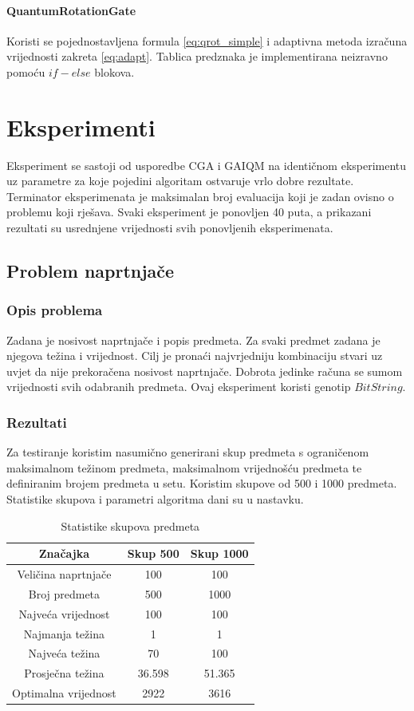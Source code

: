 \documentclass[times, utf8, zavrsni, numeric]{fer}
\begin{document}
\subsubsection{QuantumRotationGate}
Koristi se pojednostavljena formula \ref{eq:qrot_simple} i adaptivna metoda izračuna vrijednosti zakreta \ref{eq:adapt}. Tablica predznaka je implementirana neizravno pomoću $if-else$ blokova.

\chapter{Eksperimenti} 
\label{ch:primjena}
Eksperiment se sastoji od usporedbe CGA i GAIQM na identičnom eksperimentu uz parametre za koje pojedini algoritam ostvaruje vrlo dobre rezultate.
Terminator eksperimenata je maksimalan broj evaluacija koji je zadan ovisno o problemu koji rješava.
Svaki eksperiment je ponovljen 40 puta, a prikazani rezultati su usrednjene vrijednosti svih ponovljenih eksperimenata.

\section{Problem naprtnjače}
\subsection{Opis problema}
Zadana je nosivost naprtnjače  i popis predmeta. Za svaki predmet zadana je njegova težina i vrijednost.
Cilj je pronaći najvrjedniju kombinaciju stvari uz uvjet da nije prekoračena nosivost naprtnjače.
Dobrota jedinke računa se sumom vrijednosti svih odabranih predmeta.
Ovaj eksperiment koristi genotip $BitString$.

\subsection{Rezultati}
Za testiranje koristim nasumično generirani skup predmeta s ograničenom maksimalnom težinom predmeta, maksimalnom vrijednošću predmeta te definiranim brojem predmeta u setu. Koristim skupove od 500 i 1000 predmeta. Statistike skupova i parametri algoritma dani su u nastavku.

\begin{table}[htb]
\caption{Statistike skupova predmeta}
\centering
\begin{tabular}{ccc} \hline
Značajka & Skup 500 & Skup 1000 \\ 
\hline
Veličina naprtnjače & 100 & 100 \\
Broj predmeta & 500 & 1000 \\
Najveća vrijednost & 100 & 100 \\
Najmanja težina & 1 & 1 \\
Najveća težina & 70 & 100 \\
Prosječna težina & 36.598 & 51.365 \\
Optimalna vrijednost & 2922 & 3616 \\
\hline
\end{tabular}
\end{table}
\end{document}
